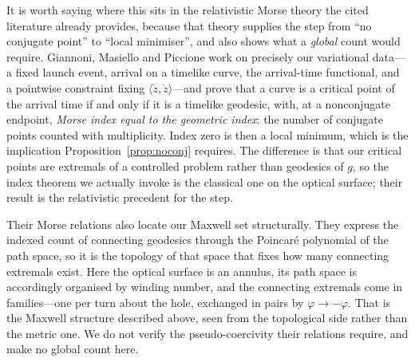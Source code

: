 \documentclass[12pt]{iopart}
\theoremstyle{plain}
\theoremstyle{definition}
\theoremstyle{remark}
\begin{document}
It is worth saying where this sits in the relativistic Morse theory the cited
literature already provides, because that theory supplies the step from ``no
conjugate point'' to ``local minimiser'', and also shows what a \emph{global}
count would require. Giannoni, Masiello and Piccione
\cite{GiannoniMasielloPiccione2000} work on precisely our variational data---a
fixed launch event, arrival on a timelike curve, the arrival-time functional, and
a pointwise constraint fixing $\langle\dot z,\dot z\rangle$---and prove that a
curve is a critical point of the arrival time if and only if it is a timelike
geodesic, with, at a nonconjugate endpoint, \emph{Morse index equal to the
geometric index}: the number of conjugate points counted with multiplicity. Index
zero is then a local minimum, which is the implication
Proposition~\ref{prop:noconj} requires. The difference is that our critical
points are extremals of a controlled problem rather than geodesics of $g$, so the
index theorem we actually invoke is the classical one on the optical surface;
their result is the relativistic precedent for the step.

Their Morse relations also locate our Maxwell set structurally. They express the
indexed count of connecting geodesics through the Poincar\'e polynomial of the
path space, so it is the topology of that space that fixes how many connecting
extremals exist. Here the optical surface is an annulus, its path space is
accordingly organised by winding number, and the connecting extremals come in
families---one per turn about the hole, exchanged in pairs by
$\varphi\to-\varphi$. That is the Maxwell structure described above, seen from
the topological side rather than the metric one. We do not verify the
pseudo-coercivity their relations require, and make no global count here.
\end{document}
